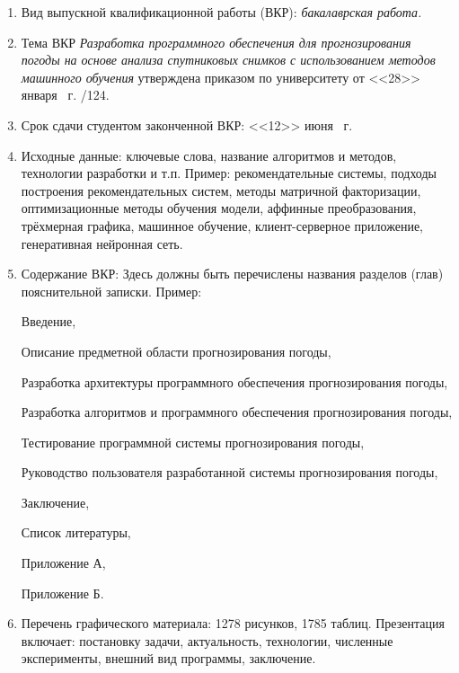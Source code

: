 \documentclass[14pt]{extarticle}
\begin{document}
\begin{enumerate}[label=\arabic*., leftmargin=0pt, labelsep=0.25em, itemindent=13pt, itemsep=6pt] %
	\small\linespread{1}\selectfont
	\item Вид выпускной квалификационной работы (ВКР): \textit {бакалаврская работа.}
	\item Тема ВКР \textit{Разработка программного обеспечения для прогнозирования погоды на основе анализа спутниковых снимков с использованием методов машинного обучения} 
	утверждена приказом по университету от <<28>> января \the\year \ г. /124.
	\item Срок сдачи студентом законченной ВКР: <<12>> июня \the\year \ г.
	\item Исходные данные: ключевые слова, название алгоритмов и методов, технологии разработки и т.п. Пример:  рекомендательные системы, подходы построения рекомендательных систем, методы матричной факторизации, оптимизационные методы обучения модели, аффинные преобразования, трёхмерная графика, машинное обучение, клиент-серверное приложение, генеративная нейронная сеть.
	\item Содержание ВКР:
	Здесь должны быть перечислены названия разделов (глав) пояснительной записки. Пример: \par
	\hspace{13pt}Введение,\par
	\hspace{13pt}Описание предметной области прогнозирования погоды,\par
	\hspace{13pt}Разработка архитектуры программного обеспечения прогнозирования погоды,\par
	\hspace{13pt}Разработка алгоритмов и программного обеспечения прогнозирования погоды,\par
	\hspace{13pt}Тестирование программной системы прогнозирования погоды,\par
	\hspace{13pt}Руководство пользователя разработанной системы прогнозирования погоды,\par
	\hspace{13pt}Заключение,\par
	\hspace{13pt}Список литературы,\par
	\hspace{13pt}Приложение А,\par
	\hspace{13pt}Приложение Б.\par
	\newpage
	\item Перечень графического материала: 1278 рисунков, 1785 таблиц. Презентация включает: постановку задачи, актуальность, технологии, численные эксперименты, внешний вид программы, заключение.
\end{enumerate}
\end{document}
